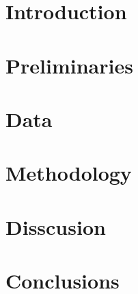 \documentclass{umassthesis}          %
\begin{document}


\chapter{Introduction}\label{chp:intro}

	


\chapter{Preliminaries}\label{chp:prlm}

	

\chapter{Data}\label{chp:data}
	

\chapter{Methodology}\label{chp:method}
	
	
\chapter{Disscusion}\label{chp:diss}
	

\chapter{Conclusions}\label{chp:cncld}
	



\appendix

\backmatter  %


\end{document}
